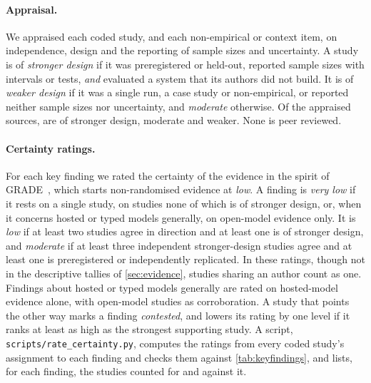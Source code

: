 \paragraph{Appraisal.}
We appraised each coded study, and each non-empirical or context item, on independence, design and the reporting of sample sizes and uncertainty.
A study is of \emph{stronger design} if it was preregistered or held-out, reported sample sizes with intervals or tests, \emph{and} evaluated a system that its authors did not build.
It is of \emph{weaker design} if it was a single run, a case study or non-empirical, or reported neither sample sizes nor uncertainty, and \emph{moderate} otherwise.
Of the \nAppraisedAll{} appraised sources, \nStrongerAll{} are of stronger design, \nModerateAll{} moderate and \nWeakerAll{} weaker. None is peer reviewed.

\paragraph{Certainty ratings.}
For each key finding we rated the certainty of the evidence in the spirit of GRADE~\cite{guyatt2008grade}, which starts non-randomised evidence at \emph{low}.
A finding is \emph{very low} if it rests on a single study, on studies none of which is of stronger design, or, when it concerns hosted \jev{} or typed models generally, on open-model evidence only.
It is \emph{low} if at least two studies agree in direction and at least one is of stronger design, and \emph{moderate} if at least three independent stronger-design studies agree and at least one is preregistered or independently replicated.
In these ratings, though not in the descriptive tallies of \cref{sec:evidence}, studies sharing an author count as one.
Findings about hosted \jev{} or typed models generally are rated on hosted-model evidence alone, with open-model studies as corroboration.
A study that points the other way marks a finding \emph{contested}, and lowers its rating by one level if it ranks at least as high as the strongest supporting study.
A script, \nolinkurl{scripts/rate_certainty.py}, computes the ratings from every coded study's assignment to each finding and checks them against \cref{tab:keyfindings}, and  lists, for each finding, the studies counted for and against it.

